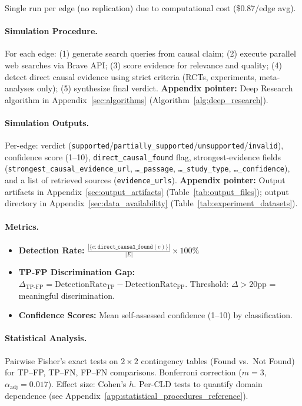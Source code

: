 Single run per edge (no replication) due to computational cost (\$0.87/edge avg).

\paragraph{Simulation Procedure.}
For each edge: (1) generate search queries from causal claim; (2) execute parallel web searches via Brave API; (3) score evidence for relevance and quality; (4) detect direct causal evidence using strict criteria (RCTs, experiments, meta-analyses only); (5) synthesize final verdict.
\textbf{Appendix pointer:} Deep Research algorithm in Appendix~\ref{sec:algorithms} (Algorithm~\ref{alg:deep_research}).

\paragraph{Simulation Outputs.}
Per-edge: verdict (\texttt{supported}/\texttt{partially\_supported}/\texttt{unsupported}/\texttt{invalid}), confidence score (1--10), \texttt{direct\_causal\_found} flag, strongest-evidence fields (\texttt{strongest\_causal\_evidence\_url}, \texttt{\dots\_passage}, \texttt{\dots\_study\_type}, \texttt{\dots\_confidence}), and a list of retrieved sources (\texttt{evidence\_urls}).
\textbf{Appendix pointer:} Output artifacts in Appendix~\ref{sec:output_artifacts} (Table~\ref{tab:output_files}); output directory in Appendix~\ref{sec:data_availability} (Table~\ref{tab:experiment_datasets}).

\paragraph{Metrics.}
\begin{itemize}[noitemsep]
    \item \textbf{Detection Rate:} $\frac{|\{e : \texttt{direct\_causal\_found}(e)\}|}{|E|} \times 100\%$
    \item \textbf{TP-FP Discrimination Gap:} $\Delta_{\text{TP-FP}} = \text{DetectionRate}_{\text{TP}} - \text{DetectionRate}_{\text{FP}}$. Threshold: $\Delta > 20$pp = meaningful discrimination.
    \item \textbf{Confidence Scores:} Mean self-assessed confidence (1--10) by classification.
\end{itemize}

\paragraph{Statistical Analysis.}
Pairwise Fisher's exact tests on $2\times2$ contingency tables (Found vs.\ Not Found) for TP--FP, TP--FN, FP--FN comparisons. Bonferroni correction ($m=3$, $\alpha_{\text{adj}}=0.017$). Effect size: Cohen's $h$. Per-CLD tests to quantify domain dependence (see Appendix~\ref{app:statistical_procedures_reference}).

